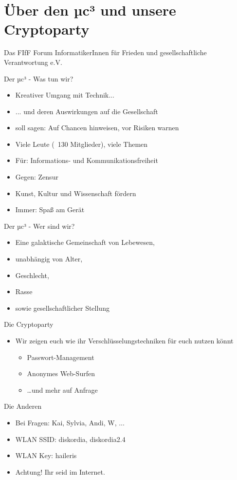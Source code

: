 \section{Über den µc³ und unsere Cryptoparty}
  \begin{frame}{Das FIfF}
    Forum InformatikerInnen für Frieden und gesellschaftliche Verantwortung e.V.
  \end{frame}
  \begin{frame}{Der µc³ - Was tun wir?}
    \begin{itemize}
      \item{Kreativer Umgang mit Technik...}
      \item{... und deren Auswirkungen auf die Gesellschaft}
      \item{soll sagen: Auf Chancen hinweisen, vor Risiken warnen}
      \item{Viele Leute (~130 Mitglieder), viele Themen}
      \item{Für: Informations- und Kommunikationsfreiheit}
      \item{Gegen: Zensur}
      \item{Kunst, Kultur und Wissenschaft fördern}
      \item{Immer: Spaß am Gerät}
    \end{itemize}
  \end{frame}
  \begin{frame}{Der µc³ - Wer sind wir?}
    \begin{itemize}
      \item{Eine galaktische Gemeinschaft von Lebewesen,}
      \item{unabhängig von Alter,}
      \item{Geschlecht,}
      \item{Rasse}
      \item{sowie gesellschaftlicher Stellung}
    \end{itemize}
  \end{frame}
  \begin{frame}{Die Cryptoparty}
    \begin{itemize}
      \item{Wir zeigen euch wie ihr Verschlüsselungstechniken für euch nutzen könnt}
      \begin{itemize}
        \item{Passwort-Management}
        \item{Anonymes Web-Surfen}
        \item{\ldots und mehr auf Anfrage}
      \end{itemize}
    \end{itemize}
  \end{frame}
  \begin{frame}{Die Anderen}
    \begin{itemize}
      \item{Bei Fragen: Kai, Sylvia, Andi, W, ...}
      \item{WLAN SSID: diskordia, diskordia2.4}
      \item{WLAN Key: haileris}
      \item{Achtung! Ihr seid im Internet.}
    \end{itemize}
  \end{frame}

